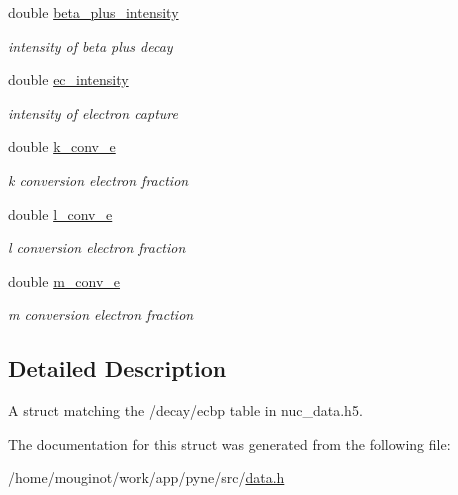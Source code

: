 \begin{DoxyCompactItemize}
\mbox{\label{structpyne_1_1ecbp_adafb0b96525249576ccc33302c452fe8}} 
double \hyperlink{structpyne_1_1ecbp_adafb0b96525249576ccc33302c452fe8}{beta\+\_\+plus\+\_\+intensity}
\begin{DoxyCompactList}\small\item\em intensity of beta plus decay \end{DoxyCompactList}\item 
\mbox{\label{structpyne_1_1ecbp_a67128407e1bd8eb131b7b2764a6813d8}} 
double \hyperlink{structpyne_1_1ecbp_a67128407e1bd8eb131b7b2764a6813d8}{ec\+\_\+intensity}
\begin{DoxyCompactList}\small\item\em intensity of electron capture \end{DoxyCompactList}\item 
\mbox{\label{structpyne_1_1ecbp_a3bb382193d514ddbda7baf4796a025d5}} 
double \hyperlink{structpyne_1_1ecbp_a3bb382193d514ddbda7baf4796a025d5}{k\+\_\+conv\+\_\+e}
\begin{DoxyCompactList}\small\item\em k conversion electron fraction \end{DoxyCompactList}\item 
\mbox{\label{structpyne_1_1ecbp_a4de2fa13e0520b5fd840cc53ad8f52dd}} 
double \hyperlink{structpyne_1_1ecbp_a4de2fa13e0520b5fd840cc53ad8f52dd}{l\+\_\+conv\+\_\+e}
\begin{DoxyCompactList}\small\item\em l conversion electron fraction \end{DoxyCompactList}\item 
\mbox{\label{structpyne_1_1ecbp_afed47f1b2eea323a4de63f67fdd236c6}} 
double \hyperlink{structpyne_1_1ecbp_afed47f1b2eea323a4de63f67fdd236c6}{m\+\_\+conv\+\_\+e}
\begin{DoxyCompactList}\small\item\em m conversion electron fraction \end{DoxyCompactList}\end{DoxyCompactItemize}


\subsection{Detailed Description}
A struct matching the \textquotesingle{}/decay/ecbp\textquotesingle{} table in nuc\+\_\+data.\+h5. 

The documentation for this struct was generated from the following file\+:\begin{DoxyCompactItemize}
\item 
/home/mouginot/work/app/pyne/src/\hyperlink{data_8h}{data.\+h}\end{DoxyCompactItemize}
